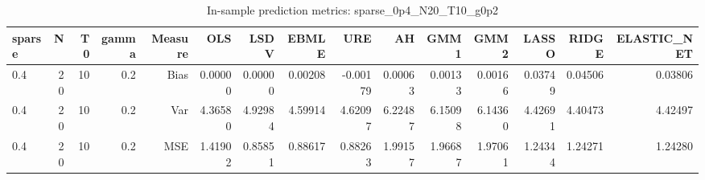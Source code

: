 \begin{table}[!htbp]\centering
\caption{In-sample prediction metrics: sparse_0p4_N20_T10_g0p2}
\label{tab:table2_sparse_0p4_N20_T10_g0p2}
\begin{tabular}{lrrrrrrrrrrrrrr}
\hline
sparse & N & T0 & gamma & Measure & OLS & LSDV & EBMLE & URE & AH & GMM1 & GMM2 & LASSO & RIDGE & ELASTIC_NET \\
\hline
0.4 & 20 & 10 & 0.2 & Bias & 0.00000 & 0.00000 & 0.00208 & -0.00179 & 0.00063 & 0.00133 & 0.00166 & 0.03749 & 0.04506 & 0.03806 \\
0.4 & 20 & 10 & 0.2 & Var & 4.36580 & 4.92984 & 4.59914 & 4.62097 & 6.22487 & 6.15098 & 6.14360 & 4.42691 & 4.40473 & 4.42497 \\
0.4 & 20 & 10 & 0.2 & MSE & 1.41902 & 0.85851 & 0.88617 & 0.88263 & 1.99157 & 1.96687 & 1.97061 & 1.24344 & 1.24271 & 1.24280 \\
\hline
\end{tabular}
\end{table}

